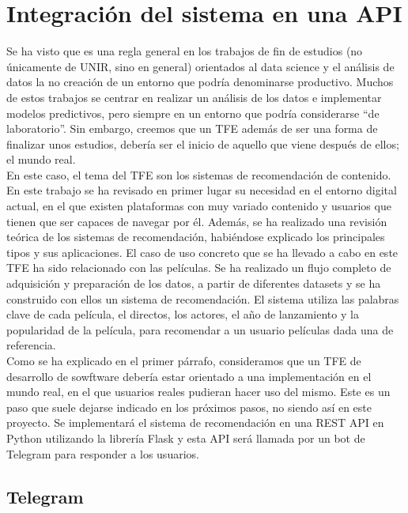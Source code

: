 \chapter{Integración del sistema en una API}\label{chap:api}

Se ha visto que es una regla general en los trabajos de fin de estudios (no únicamente de UNIR, sino en general) orientados al data science y el análisis de datos la no creación de un entorno que podría denominarse productivo. Muchos de estos trabajos se centrar en realizar un análisis de los datos e implementar modelos predictivos, pero siempre en un entorno que podría considerarse ``de laboratorio''. Sin embargo, creemos que un TFE además de ser una forma de finalizar unos estudios, debería ser el inicio de aquello que viene después de ellos; el mundo real.\\

En este caso, el tema del TFE son los sistemas de recomendación de contenido. En este trabajo se ha revisado en primer lugar su necesidad en el entorno digital actual, en el que existen plataformas con muy variado contenido y usuarios que tienen que ser capaces de navegar por él. Además, se ha realizado una revisión teórica de los sistemas de recomendación, habiéndose explicado los principales tipos y sus aplicaciones. El caso de uso concreto que se ha llevado a cabo en este TFE ha sido relacionado con las películas. Se ha realizado un flujo completo de adquisición y preparación de los datos, a partir de diferentes datasets y se ha construido con ellos un sistema de recomendación. El sistema utiliza las palabras clave de cada película, el directos, los actores, el año de lanzamiento y la popularidad de la película, para recomendar a un usuario películas dada una de referencia.\\

Como se ha explicado en el primer párrafo, consideramos que un TFE de desarrollo de sowftware debería estar orientado a una implementación en el mundo real, en el que usuarios reales pudieran hacer uso del mismo. Este es un paso que suele dejarse indicado en los próximos pasos, no siendo así en este proyecto. Se implementará el sistema de recomendación en una REST API en Python utilizando la librería Flask y esta API será llamada por un bot de Telegram para responder a los usuarios.

\section{Telegram}

